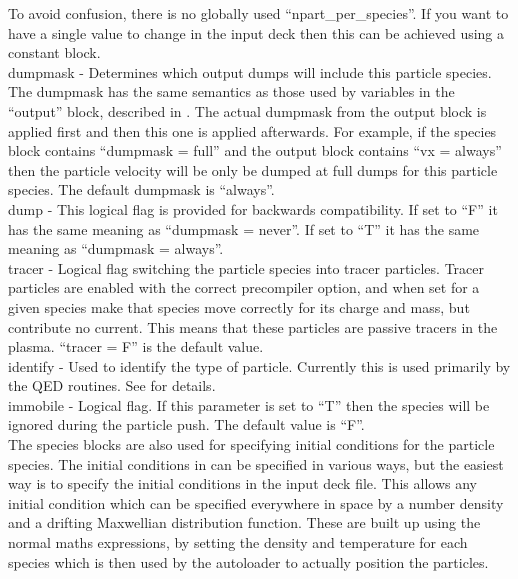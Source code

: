 To avoid confusion, there is no globally used ``npart\_per\_species''.  If you
want to have a single value to change in the input deck then this can be
achieved using a constant block.\\

{\emphtext dumpmask} - Determines which output dumps will include this
particle species. The dumpmask has the same semantics as those used
by variables in the ``output'' block, described in .
The actual dumpmask from the output block is applied first and then
this one is applied afterwards. For example, if the species block contains
``dumpmask = full'' and the output block contains ``vx = always''
then the particle velocity will be only be dumped at full dumps for
this particle species. The default dumpmask is ``always''.\\

{\emphtext dump} - This logical flag is provided for backwards compatibility.
If set to ``F'' it has the same meaning as ``dumpmask = never''. If set to
``T'' it has the same meaning as ``dumpmask = always''.\\

{\emphtext tracer} - Logical flag switching the particle species
into tracer particles. Tracer particles are enabled with the correct
precompiler option, and when set for a given species make that species move
correctly for its charge and mass, but contribute no current. This means that
these particles are passive tracers in the plasma. ``tracer = F'' is the
default value.\\

{\emphtext identify} - Used to identify the type of particle. Currently this
is used primarily by the QED routines. See  for details.\\

{\emphtext immobile} - Logical flag. If this parameter is set to ``T'' then
the species will be ignored during the particle push. The default value
is ``F''.\\

The species blocks are also used for specifying initial conditions for
the particle species. The initial conditions in {\EPOCH} can be specified in
various ways, but the easiest way is to specify the initial conditions in the
input deck file. This allows any initial condition which can be specified
everywhere in space by a number density and a drifting Maxwellian distribution
function.
These are built up using the normal maths
expressions, by setting the density and temperature for each species which is
then used by the autoloader to actually position the particles.

